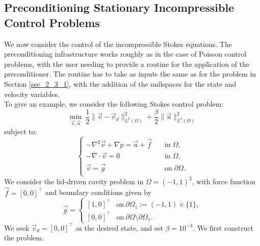 \documentclass[letterpaper,10pt,english]{sphinxmanual}
\begin{document}
\subsection{Preconditioning Stationary Incompressible Control Problems}
We now consider the control of the incompressible Stokes equations. The preconditioning infrastructure works roughly as in the case of Poisson control problems, with the user needing to provide a routine for the application of the preconditioner. The routine has to take as inputs the same as for the problem in Section \ref{sec_2_3_1}, with the addition of the nullspaces for the state and velocity variables.\\
To give an example, we consider the following Stokes control problem:
\begin{displaymath}
\min_{\vec{v},\vec{u}} ~ \frac{1}{2} \| \vec{v} - \vec{v}_d \|^2_{L^2(\Omega)} + \frac{\beta}{2} \| \vec{u} \|^2_{L^2(\Omega)}
\end{displaymath}
subject to:
\begin{displaymath}
\left\{
\begin{array}{ll}
- \nabla^2 \vec{v} + \nabla p = \vec{u} + \vec{f} & \quad \mathrm{in} \; \Omega,\\
- \nabla \cdot \vec{v} = 0 & \quad \mathrm{in} \; \Omega,\\
\vec{v} = \vec{g} & \quad \mathrm{on} \; \partial \Omega.\\
\end{array}
\right.
\end{displaymath}
We consider the lid-driven cavity problem in $\Omega = (-1,1)^2$, with force function $\vec{f}=[0,0]^\top$ and boundary conditions given by
\begin{displaymath}
	\vec{g} =
	\left\{
		\begin{array}{ll}
			\left[1,0\right]^\top & \mathrm{on} \: \partial \Omega_1 := (-1,1) 
				\times \{1 \},\\
			\left[0,0\right]^\top & \mathrm{on} \: \partial \Omega
				\setminus \partial\Omega_1.
		\end{array}
	\right.
\end{displaymath}
We seek $\vec{v}_d=[0,0]^\top$ as the desired state, and set $\beta=10^{-4}$. We first construct the problem.
\end{document}
